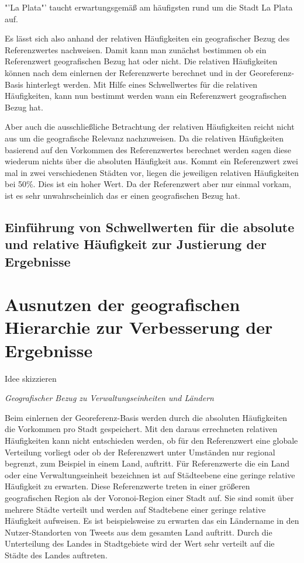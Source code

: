 				"'La Plata"' taucht erwartungsgemäß am häufigsten rund um die Stadt La Plata auf.  

				Es lässt sich also anhand der relativen Häufigkeiten ein geografischer Bezug des Referenzwertes nachweisen.
				Damit kann man zunächst bestimmen ob ein Referenzwert geografischen Bezug hat oder nicht.
				Die relativen Häufigkeiten können nach dem einlernen der Referenzwerte berechnet und in der Georeferenz-Basis hinterlegt werden.
				Mit Hilfe eines Schwellwertes für die relativen Häufigkeiten, kann nun bestimmt werden wann ein Referenzwert geografischen Bezug hat.

				Aber auch die ausschließliche Betrachtung der relativen Häufigkeiten reicht nicht aus um die geografische Relevanz nachzuweisen.
				Da die relativen Häufigkeiten basierend auf den Vorkommen des Referenzwertes berechnet werden sagen diese wiederum nichts über die absoluten Häufigkeit aus. 
				Kommt ein Referenzwert zwei mal in zwei verschiedenen Städten vor, liegen die jeweiligen relativen Häufigkeiten bei 50\%.
				Dies ist ein hoher Wert.
				Da der Referenzwert aber nur einmal vorkam, ist es sehr unwahrscheinlich das er einen geografischen Bezug hat.  

		\subsection{Einführung von Schwellwerten für die absolute und relative Häufigkeit zur Justierung der Ergebnisse}  


	\section{Ausnutzen der geografischen Hierarchie zur Verbesserung der Ergebnisse} \label{sec:ausnutzenDerGeografischenHierarchie}

		Idee skizzieren

		\textit{Geografischer Bezug zu Verwaltungseinheiten und Ländern} 

			Beim einlernen der Georeferenz-Basis werden durch die absoluten Häufigkeiten die Vorkommen pro Stadt gespeichert.
			Mit den daraus errechneten relativen Häufigkeiten kann nicht entschieden werden, ob für den Referenzwert eine globale Verteilung vorliegt oder ob der Referenzwert unter Umständen nur regional begrenzt, zum Beispiel in einem Land, auftritt.
			Für Referenzwerte die ein Land oder eine Verwaltungseinheit bezeichnen ist auf Städteebene eine geringe relative Häufigkeit zu erwarten.
			Diese Referenzwerte treten in einer größeren geografischen Region als der Voronoi-Region einer Stadt auf.
			Sie sind somit über mehrere Städte verteilt und werden auf Stadtebene einer geringe relative Häufigkeit aufweisen.
			Es ist beispielsweise zu erwarten das ein Ländername in den Nutzer-Standorten von Tweets aus dem gesamten Land auftritt.
			Durch die Unterteilung des Landes in Stadtgebiete wird der Wert sehr verteilt auf die Städte des Landes auftreten.

